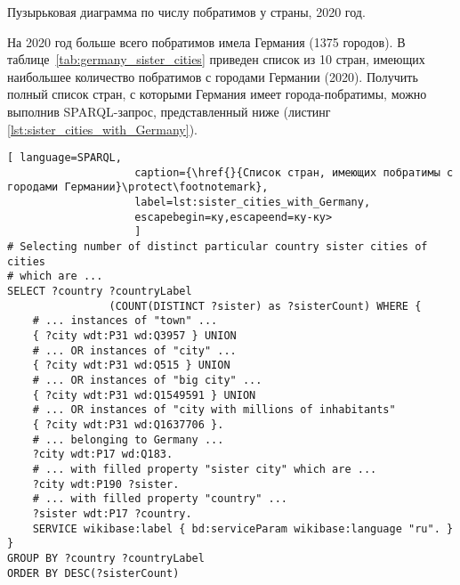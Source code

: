 \begin{marginfigure}[0.0cm]
{
\setlength{\fboxsep}{0pt}%
\setlength{\fboxrule}{1pt}%
%
}
  \caption{Пузырьковая диаграмма по числу побратимов у страны, 2020 год.}%
  \label{fig:Bubble_countries_sister_cities}%
\end{marginfigure}

На 2020 год больше всего побратимов имела Германия (\num{1375} городов). В таблице~\ref{tab:germany_sister_cities} приведен список из 10 стран, имеющих наибольшее количество побратимов с городами Германии (2020). Получить полный список стран, с которыми Германия имеет города-побратимы, можно выполнив SPARQL-запрос, представленный ниже (листинг \ref{lst:sister_cities_with_Germany}).

\begin{lstlisting}[ language=SPARQL, 
                    caption={\href{}{Список стран, имеющих побратимы с городами Германии}\protect\footnotemark},
                    label=lst:sister_cities_with_Germany, 
                    escapebegin=ку,escapeend=ку-ку>
                    ]
# Selecting number of distinct particular country sister cities of cities 
# which are ...
SELECT ?country ?countryLabel 
				(COUNT(DISTINCT ?sister) as ?sisterCount) WHERE {  
	# ... instances of "town" ...                                                                    
	{ ?city wdt:P31 wd:Q3957 } UNION   
	# ... OR instances of "city" ...                                  
	{ ?city wdt:P31 wd:Q515 } UNION   
	# ... OR instances of "big city" ...                                   
	{ ?city wdt:P31 wd:Q1549591 } UNION  
	# ... OR instances of "city with millions of inhabitants"                                
	{ ?city wdt:P31 wd:Q1637706 }.    
	# ... belonging to Germany ...                                  
	?city wdt:P17 wd:Q183. 
	# ... with filled property "sister city" which are ...                                               
	?city wdt:P190 ?sister.    
	# ... with filled property "country" ...                                         
	?sister wdt:P17 ?country.                                            
	SERVICE wikibase:label { bd:serviceParam wikibase:language "ru". }
}
GROUP BY ?country ?countryLabel
ORDER BY DESC(?sisterCount)\end{lstlisting}

